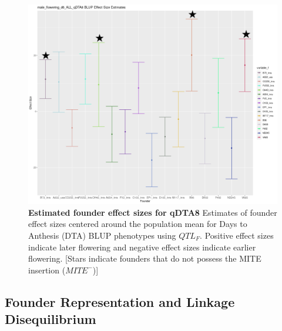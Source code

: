 \documentclass[article,9pt,twocolumn,twoside]{rilabRxiv}
\begin{document}


\begin{figure}[ht]
\centering
\includegraphics[width=\linewidth]{figures/male_flowering_d6_ALL_qDTA8_BLUP_founder_effect_sizes_lme4qtl.png}
\caption{\textbf{Estimated founder effect sizes for qDTA8} Estimates of founder effect sizes centered around the population mean for Days to Anthesis (DTA) BLUP phenotypes using $QTL_F$. Positive effect sizes indicate later flowering and negative effect sizes indicate earlier flowering. [Stars indicate founders that do not possess the MITE insertion ($MITE^-$)]}
\label{fig:foundervgt1figure}
\end{figure}

\subsection{Founder Representation and Linkage Disequilibrium}
\end{document}
